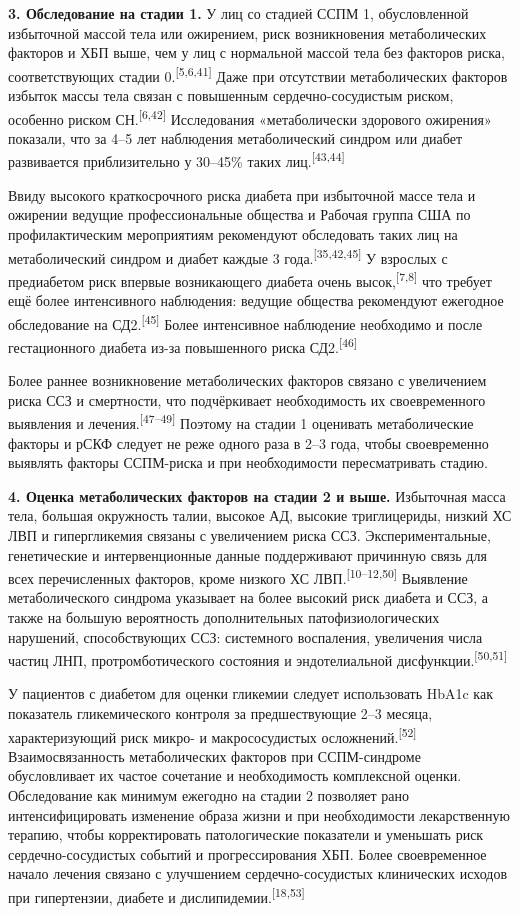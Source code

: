 \documentclass[11pt,a4paper]{article}
\newcommand{\src}[1]{\textsuperscript{[#1]}}
\begin{document}
\textbf{3. Обследование на стадии 1.} У лиц со стадией ССПМ 1, обусловленной избыточной массой тела или ожирением, риск возникновения метаболических факторов и ХБП выше, чем у лиц с нормальной массой тела без факторов риска, соответствующих стадии 0.\src{5,6,41} Даже при отсутствии метаболических факторов избыток массы тела связан с повышенным сердечно-сосудистым риском, особенно риском СН.\src{6,42} Исследования «метаболически здорового ожирения» показали, что за 4--5 лет наблюдения метаболический синдром или диабет развивается приблизительно у 30--45\% таких лиц.\src{43,44}

Ввиду высокого краткосрочного риска диабета при избыточной массе тела и ожирении ведущие профессиональные общества и Рабочая группа США по профилактическим мероприятиям рекомендуют обследовать таких лиц на метаболический синдром и диабет каждые 3 года.\src{35,42,45} У взрослых с предиабетом риск впервые возникающего диабета очень высок,\src{7,8} что требует ещё более интенсивного наблюдения: ведущие общества рекомендуют ежегодное обследование на СД2.\src{45} Более интенсивное наблюдение необходимо и после гестационного диабета из-за повышенного риска СД2.\src{46}

Более раннее возникновение метаболических факторов связано с увеличением риска ССЗ и смертности, что подчёркивает необходимость их своевременного выявления и лечения.\src{47--49} Поэтому на стадии 1 оценивать метаболические факторы и рСКФ следует не реже одного раза в 2--3 года, чтобы своевременно выявлять факторы ССПМ-риска и при необходимости пересматривать стадию.

\textbf{4. Оценка метаболических факторов на стадии 2 и выше.} Избыточная масса тела, большая окружность талии, высокое АД, высокие триглицериды, низкий ХС ЛВП и гипергликемия связаны с увеличением риска ССЗ. Экспериментальные, генетические и интервенционные данные поддерживают причинную связь для всех перечисленных факторов, кроме низкого ХС ЛВП.\src{10--12,50} Выявление метаболического синдрома указывает на более высокий риск диабета и ССЗ, а также на большую вероятность дополнительных патофизиологических нарушений, способствующих ССЗ: системного воспаления, увеличения числа частиц ЛНП, протромботического состояния и эндотелиальной дисфункции.\src{50,51}

У пациентов с диабетом для оценки гликемии следует использовать HbA1c как показатель гликемического контроля за предшествующие 2--3 месяца, характеризующий риск микро- и макрососудистых осложнений.\src{52} Взаимосвязанность метаболических факторов при ССПМ-синдроме обусловливает их частое сочетание и необходимость комплексной оценки. Обследование как минимум ежегодно на стадии 2 позволяет рано интенсифицировать изменение образа жизни и при необходимости лекарственную терапию, чтобы корректировать патологические показатели и уменьшать риск сердечно-сосудистых событий и прогрессирования ХБП. Более своевременное начало лечения связано с улучшением сердечно-сосудистых клинических исходов при гипертензии, диабете и дислипидемии.\src{18,53}
\end{document}
